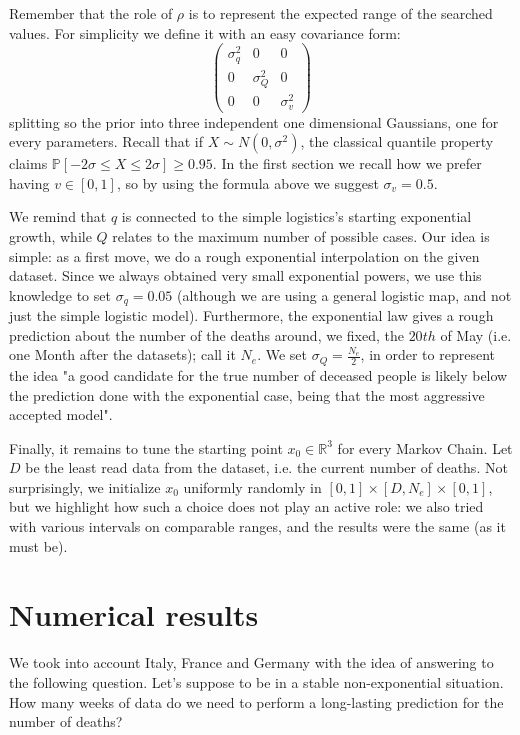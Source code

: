 \documentclass[8pt]{article}
\begin{document}
Remember that the role of $\rho$
is to represent the expected range of the searched values.
For simplicity we define it with an easy covariance form:
\begin{equation}
\begin{pmatrix}
	\sigma_q^2 & 0 & 0 \\
	0 & \sigma_Q^2 & 0 \\
	0 & 0 & \sigma_v^2
\end{pmatrix}
\end{equation}
splitting so the prior into three independent one dimensional Gaussians,
one for
every parameters. Recall that if $X \sim N(0,\sigma^2)$, the classical
quantile property claims 
$\mathbb{P}[-2 \sigma \leq X \leq 2 \sigma] \geq 0.95$.
In the first section we recall how we prefer having $v \in [0,1]$, so by
using the formula above we suggest $\sigma_v = 0.5$.

We remind that $q$ is connected to the simple logistics's
 starting exponential growth, while $Q$ 
relates to the maximum number of possible cases. 
Our idea is simple: as a first move,
we do a rough exponential interpolation on the given dataset. 
Since we always obtained very small exponential powers,
we use this knowledge to set  $\sigma_q = 0.05$
(although we are using a general logistic map, and not just the
simple logistic model).
Furthermore, the exponential law gives a rough
prediction about the number of the deaths around, we fixed, the $20th$ of May
(i.e. one Month after the datasets); call it $N_e$.
We set $\sigma_Q = \frac{N_e}{2}$, in order to represent the idea
"a good candidate for the true number of deceased people is likely
below the prediction done with the exponential case, being that the
most aggressive accepted model".


Finally, it remains to tune the starting point $x_0 \in \mathbb{R}^3$
for every Markov Chain. Let $D$ be
the least read data from the dataset, i.e. the current
number of deaths.
Not surprisingly, we initialize $x_0$ uniformly randomly in
$[0, 1] \times [D, N_e] \times [0,1]$, but we highlight how such a choice
does not play an active role: we also tried with various intervals on 
comparable ranges, and the results were the same (as it must be).


\section{Numerical results}
We took into account Italy, France and Germany with the idea of
answering to the following question.
Let's suppose to be in a stable non-exponential situation. 
How many weeks of data do we need to perform a long-lasting prediction
for the number of deaths?
\end{document}
